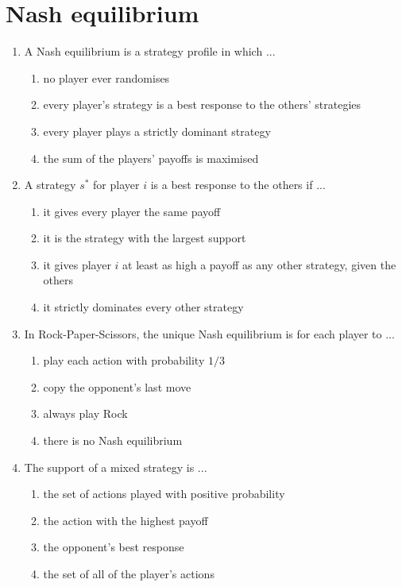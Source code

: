 \documentclass[11pt]{article}
\begin{document}
\section*{Nash equilibrium}
\begin{enumerate}[itemsep=6pt]
  \item A Nash equilibrium is a strategy profile in which ...
  \begin{enumerate}
    \item no player ever randomises
    \item every player's strategy is a best response to the others' strategies
    \item every player plays a strictly dominant strategy
    \item the sum of the players' payoffs is maximised
  \end{enumerate}
  \item A strategy \(s^*\) for player \(i\) is a best response to the others if ...
  \begin{enumerate}
    \item it gives every player the same payoff
    \item it is the strategy with the largest support
    \item it gives player \(i\) at least as high a payoff as any other strategy, given the others
    \item it strictly dominates every other strategy
  \end{enumerate}
  \item In Rock-Paper-Scissors, the unique Nash equilibrium is for each player to ...
  \begin{enumerate}
    \item play each action with probability \(1/3\)
    \item copy the opponent's last move
    \item always play Rock
    \item there is no Nash equilibrium
  \end{enumerate}
  \item The support of a mixed strategy is ...
  \begin{enumerate}
    \item the set of actions played with positive probability
    \item the action with the highest payoff
    \item the opponent's best response
    \item the set of all of the player's actions
  \end{enumerate}

\end{enumerate}
\end{document}
